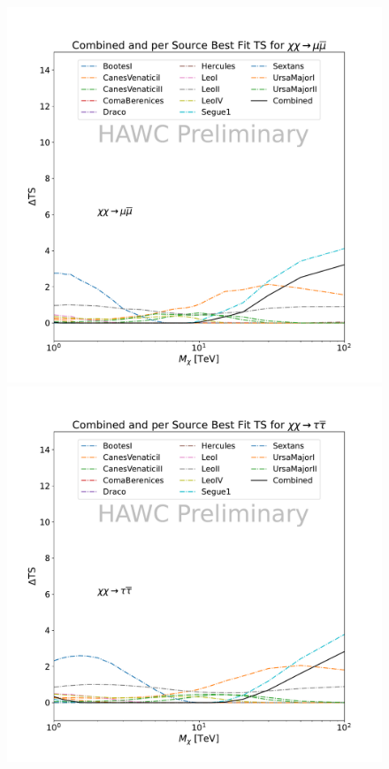 \begin{figure}[t]
{        \includegraphics[scale=0.21]{figures/glory_duck/hawc/CombinedTS_data_mumu_.pdf}
        \includegraphics[scale=0.21]{figures/glory_duck/hawc/CombinedTS_data_tautau_.pdf}
}
\end{figure}
